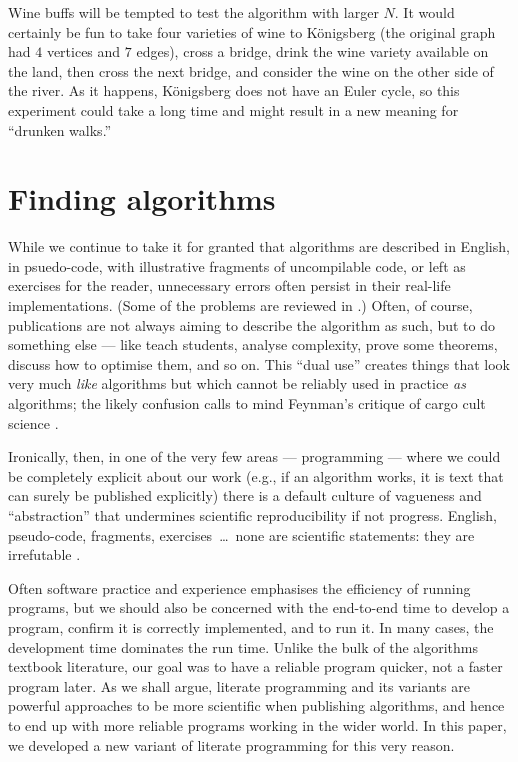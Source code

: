 \documentclass[prodmode,acmtecs]{acmsmall} %
\begin{document}

Wine buffs will be tempted to test the algorithm with larger $N$\@. It would certainly be fun to take four varieties of wine to K\"onigsberg (the original graph had $4$ vertices and $7$ edges), cross a bridge, drink the wine variety available on the land, then cross the next bridge, and consider the wine on the other side of the river. As it happens, K\"onigsberg does not have an Euler cycle, so this experiment could take a long time and might result in a new meaning for ``drunken walks.''

\section{Finding algorithms}\label{new-approach}
While we continue to take it for granted that algorithms are described in English, in psuedo-code, with illustrative fragments of uncompilable code, or left as exercises for the reader, unnecessary errors often persist in their real-life implementations. (Some of the problems are reviewed in \cite{heedless,jmlr}.) Often, of course, publications are not always aiming to describe the algorithm as such, but to do something else --- like teach students, analyse complexity, prove some theorems, discuss how to optimise them, and so on. This ``dual use'' creates things that look very much \emph{like\/} algorithms but which cannot be reliably used in practice \emph{as\/} algorithms; the likely confusion calls to mind Feynman's critique of cargo cult science \cite{feynman}. 

Ironically, then, in one of the very few areas --- programming --- where we could be completely explicit about our work (e.g., if an algorithm works, it is text that can surely be published explicitly) there is a default culture of vagueness and ``abstraction'' that undermines scientific reproducibility if not progress. English, pseudo-code, fragments, exercises~\ldots\ none are scientific statements: they are irrefutable \cite{popper}. 

Often software practice and experience emphasises the efficiency of running programs, but we should also be concerned with the end-to-end time to develop a program, confirm it is correctly implemented, and to run it. In many cases, the development time dominates the run time. Unlike the bulk of the algorithms textbook literature, our goal was to have a reliable program quicker, not a faster program later. As we shall argue, literate programming and its variants are powerful approaches to be more scientific when publishing algorithms, and hence to end up with more reliable programs working in the wider world. In this paper, we developed a new variant of literate programming for this very reason.
\end{document}
